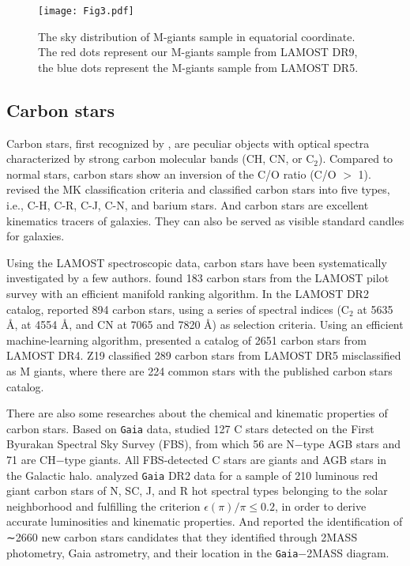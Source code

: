 \documentclass[manuscript]{aastex62}
\newcommand{\gaia}{\texttt{Gaia}}
\begin{document}
\begin{CJK*}{UTF8}{gbsn}
\begin{figure*}
  \centering
   \texttt{[image: Fig3.pdf]}
  \caption{The sky distribution of M-giants sample in equatorial coordinate. The red dots represent our M-giants sample from LAMOST DR9, the blue dots represent the M-giants sample from LAMOST DR5.}
   \label{ra}
\end{figure*}

\subsection{Carbon stars}
Carbon stars, first recognized by \citet{1869AN.....73..129S}, are peculiar objects with optical spectra characterized by strong carbon molecular bands (CH, CN, or C$_2$). Compared to normal stars, carbon stars show an inversion of the C/O ratio (C/O $>$ 1). \citet{1996ApJS..105..419B} revised the MK classification criteria and classified carbon stars into five types, i.e., C-H, C-R, C-J, C-N, and barium stars. And carbon stars are excellent kinematics tracers of galaxies. They can also be served as visible standard candles for galaxies.

Using the LAMOST spectroscopic data, carbon stars have been systematically investigated by a few authors. \citet{2015RAA....15.1671S} found 183 carbon stars from the LAMOST pilot survey with an  efficient manifold ranking algorithm. In the LAMOST DR2 catalog, \citet{2016ApJS..226....1J} reported 894 carbon stars, using a series of spectral indices (C$_2$ at 5635 \AA,  at 4554 \AA, and CN at 7065 and 7820 \AA) as selection criteria. Using an efficient machine-learning algorithm, \citet{2018ApJS..234...31L} presented a catalog of 2651 carbon stars from LAMOST DR4. Z19 classified 289 carbon stars from LAMOST DR5 misclassified as M giants, where there are 224 common stars with the published carbon stars catalog. 

There are also some researches about the chemical and kinematic properties of carbon stars. Based on \gaia{} data, \citet{2020CoBAO..67..206K} studied 127 C stars detected on the First Byurakan Spectral Sky Survey (FBS), from which 56 are N$-$type AGB stars and 71 are CH$-$type giants. All FBS-detected C stars are giants and AGB stars in the Galactic halo. \citet{2020A&A...633A.135A} analyzed \gaia{} DR2 data for a sample of 210 luminous red giant carbon stars of N, SC, J, and R hot spectral types belonging to the solar neighborhood and fulfilling the criterion $\epsilon(\pi)/\pi \leq 0.2$, in order to derive accurate luminosities and kinematic properties. And \citet{2022A&A...664A..45A} reported the identification of ∼2660 new carbon stars candidates that they identified through 2MASS photometry, Gaia astrometry, and their location in the \gaia{}$-$2MASS diagram.


\end{CJK*}
\end{document}
